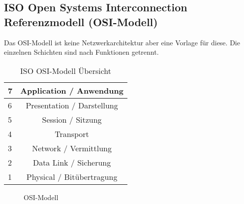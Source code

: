 \subsection{ISO Open Systems Interconnection Referenzmodell (OSI-Modell)}

Das OSI-Modell ist keine Netzwerkarchitektur aber eine Vorlage für diese. Die einzelnen Schichten sind nach Funktionen getrennt.

\begin{table}[H]
    \centering
    \begin{tabular}{|l|c|}
        \hline
        7 & Application / Anwendung    \\\hline
        6 & Presentation / Darstellung \\\hline
        5 & Session / Sitzung          \\\hline
        4 & Transport                  \\\hline
        3 & Network / Vermittlung      \\\hline
        2 & Data Link / Sicherung      \\\hline
        1 & Physical / Bitübertragung  \\\hline
    \end{tabular}
    \caption{ISO OSI-Modell Übersicht}
\end{table}

\begin{figure}[H]
    \centering
    
    \caption{OSI-Modell}
\end{figure}
\FloatBarrier